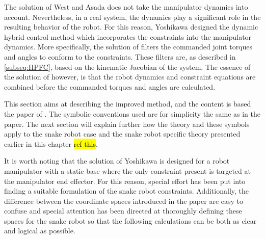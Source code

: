 The solution of West and Asada \cite{west1985method} does not take the manipulator dynamics into account. Nevertheless, in a real system, the dynamics play a significant role in the resulting behavior of the robot. For this reason, Yoshikawa \cite{yoshikawa1987dynamic} designed the dynamic hybrid control method which incorporates the constraints into the manipulator dynamics. More specifically, the solution of \cite{west1985method} filters the commanded joint torques and angles to conform to the constraints. These filters are, as described in \ref{subseq:HPFC}, based on the kinematic Jacobian of the system. The essence of the solution of \cite{yoshikawa1987dynamic} however, is that the robot dynamics and constraint equations are combined before the commanded torques and angles are calculated. 

This section aims at describing the improved method, and the content is based the paper of \cite{yoshikawa1987dynamic}. The symbolic conventions used are for simplicity the same as in the paper. The next section will explain further how the theory and these symbols apply to the snake robot case and the snake robot specific theory presented earlier in this chapter \hl{ref this}.

It is worth noting that the solution of Yoshikawa is designed for a robot manipulator with a static base where the only constraint present is targeted at the manipulator end effector. For this reason, special effort has been put into finding a suitable formulation of the snake robot constraints. Additionally, the difference between the coordinate spaces introduced in the paper are easy to confuse and special attention has been directed at thoroughly defining these spaces for the snake robot so that the following calculations can be both as clear and logical as possible.

